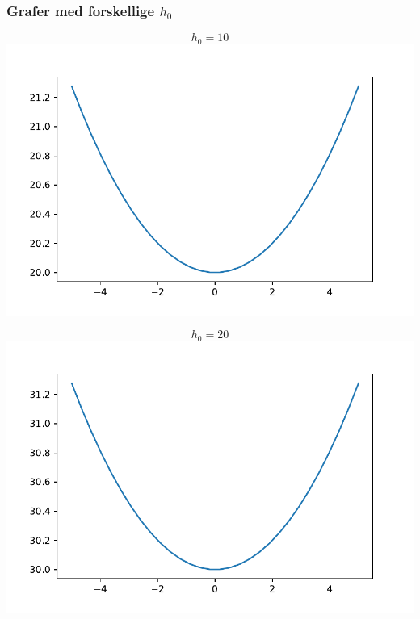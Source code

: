 \begin{frame}
\frametitle{Grafer med forskellige $h_0$}
\begin{minipage}[t]{0.49\textwidth}
$$h_0=10$$ 
\includegraphics[scale=0.3]{img/fig1}
\end{minipage}
\begin{minipage}[t]{0.49\textwidth}
$$h_0=20$$ 
\includegraphics[scale=0.3]{img/fig2}
\end{minipage}
\end{frame}
%
